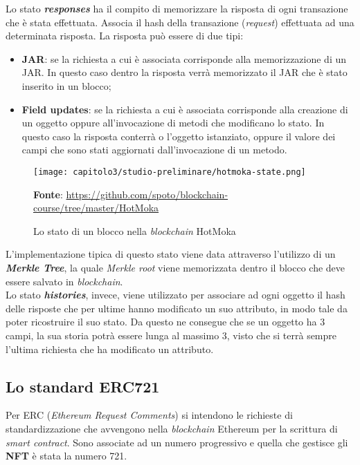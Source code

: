 Lo stato \textbf{\textit{responses}} ha il compito di memorizzare la risposta di ogni transazione che è stata effettuata. Associa il hash della transazione (\textit{request}) effettuata ad una determinata risposta. 
La risposta può essere di due tipi:
\begin{itemize}
  \item \textbf{JAR}: se la richiesta a cui è associata corrisponde alla memorizzazione di un JAR. In questo caso dentro la risposta verrà memorizzato il JAR che è stato inserito in un blocco;
  \item \textbf{Field updates}: se la richiesta a cui è associata corrisponde alla creazione di un oggetto oppure all'invocazione di metodi che modificano lo stato. In questo caso la risposta conterrà o l'oggetto istanziato, oppure il valore dei campi che sono stati aggiornati dall'invocazione di un metodo.
\end{itemize}

\begin{figure}[h!]
  \centering
  \texttt{[image: capitolo3/studio-preliminare/hotmoka-state.png]}
  \caption{Lo stato di un blocco nella \textit{blockchain} HotMoka}
  \textbf{Fonte}: \href{https://github.com/spoto/blockchain-course/tree/master/HotMoka}{https://github.com/spoto/blockchain-course/tree/master/HotMoka}
\end{figure}

L'implementazione tipica di questo stato viene data attraverso l'utilizzo di un \textbf{\textit{Merkle Tree}}, la quale \textit{Merkle root} viene memorizzata dentro il blocco che deve essere salvato in \textit{blockchain}. \\

Lo stato \textbf{\textit{histories}}, invece, viene utilizzato per associare ad ogni oggetto il hash delle risposte che per ultime hanno modificato un suo attributo, in modo tale da poter ricostruire il suo stato. Da questo ne consegue che se un oggetto ha 3 campi, la sua storia potrà essere lunga al massimo 3, visto che si terrà sempre l'ultima richiesta che ha modificato un attributo.


\subsection{Lo standard ERC721}
Per ERC (\textit{Ethereum Request Comments}) si intendono le richieste di standardizzazione che avvengono nella \textit{blockchain} Ethereum per la scrittura di \textit{smart contract}. Sono associate ad un numero progressivo e quella che gestisce gli \textbf{NFT} è stata la numero 721. \\

